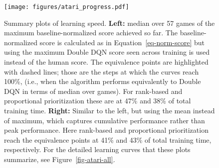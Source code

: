 \documentclass[a4paper]{article}
\begin{document}
\begin{figure}[tb]
\vspace{-1.5em}
\centerline{
\texttt{[image: figures/atari\_progress.pdf]}
}
\caption{
\label{fig-atari-progress}
Summary plots of learning speed. {\bf Left:} median over 57 games of the maximum baseline-normalized score achieved so far. The baseline-normalized score is calculated as in Equation~\ref{eq-norm-score} but using the maximum Double DQN score seen across training is used instead of the human score.  
The equivalence points are highlighted with dashed lines;
those are the steps at which the curves reach 100\%, (i.e., when the algorithm performs equivalently to Double DQN in terms of median over games). 
For rank-based and proportional prioritization these are at 47\% and 38\% of total training time.
{\bf Right:} Similar to the left, but using the mean instead of maximum, which captures cumulative performance rather than peak performance. 
Here rank-based and proportional prioritization reach the equivalence points at 41\% and 43\% of total training time, respectively.
For the detailed learning curves that these plots summarize, see Figure~\ref{fig-atari-all}.
\vspace{-1.em}
}
\end{figure}

\begin{table*}[htb]
\centering
{} \vspace{-1em}
\caption{
\label{tab-atari-normalized-summary}
Summary of normalized scores. See Table~\ref{tab-atari-normalized-30human} in the appendix for full results.
}
\end{table*}
\end{document}
